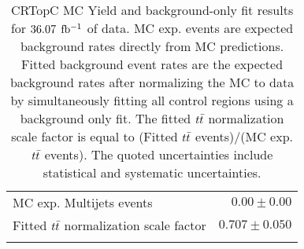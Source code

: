 \begin{table}[h!]
\begin{center}
{\begin{tabular*}{\textwidth}{@{\extracolsep{\fill}}lr}
        MC exp. Multijets events         & $0.00 \pm 0.00$                   \\
\noalign{\smallskip}\hline\noalign{\smallskip}
Fitted $t\bar{t}$ normalization scale factor & $0.707 \pm 0.050$ \\
\noalign{\smallskip}\hline\noalign{\smallskip}
\end{tabular*}
}
\caption[CRTopC MC Yield and background-only fit results for $\intlumi$ $\ifb$ of data]{CRTopC MC Yield and background-only fit results for $\intlumi$ $\ifb$ of data. MC exp. events are expected background rates directly from MC predictions.  Fitted background event rates are the expected background rates after normalizing the MC to data by simultaneously fitting all control regions using a background only fit.  The fitted $t\bar{t}$ normalization scale factor is equal to (Fitted $t\bar{t}$ events)/(MC exp. $t\bar{t}$ events). The quoted uncertainties include statistical and systematic uncertainties. }
\label{table.bkgonly.CRTopC}
\end{center}
\end{table}
%